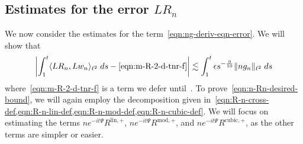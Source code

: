 \documentclass[letterpaper, reqno,final]{amsart}
\newcommand{\discrAvg}{\Psi}
\newcommand{\invLinProp}[1][t]{e^{-i#1\discrAvg}}
\begin{document}
\subsection{\label{sec:weighted-l2-eqn-err}Estimates for the error \texorpdfstring{$LR_n$}{LR\_n}}
We now consider the estimates for the term~\eqref{eqn:ng-deriv-eqn-error}.  We will show that
\begin{equation}
    \left|\int_1^t \langle L R_n, Lw_n \rangle_{\ell^2}\;ds - \eqref{eqn:m-R-2-d-tnr-f}\right| \lesssim \int_1^t \epsilon s^{-\frac{9}{10}}\lVert ng_n \rVert_{\ell^2}\;ds\label{eqn:n-Rn-desired-bound}
\end{equation}
where~\eqref{eqn:m-R-2-d-tnr-f} is a term we defer until~.  To prove~\eqref{eqn:n-Rn-desired-bound}, we will again employ the decomposition given in~\cref{eqn:R-n-cross-def,eqn:R-n-lin-def,eqn:R-n-mod-def,eqn:R-n-cubic-def}.  We will focus on estimating the terms $n\invLinProp[t]R^{\text{lin},+}$, $n\invLinProp[t]R^{\text{mod},+}$, and $n\invLinProp[t]R^{\text{cubic},+}$, as the other terms are simpler or easier.
\end{document}
